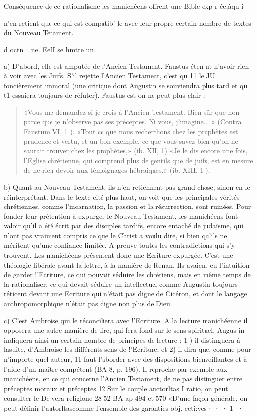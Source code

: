 Conséquence de ce rationalisme les manichéens offrent une Bible exp r ée,àqu i
 
n'en retient que ce qui est compatib' le avec leur propre certain nombre de textes du Nouveau Tetament.
 
d octn· ne. EeII se hmtte	un
 

a)	D'abord, elle est amputée de l'Ancien Testament. Faustus éten nt n'avoir rien à voir avec les Juifs. S'il rejette l'Ancien Testament, c'est qu 11 le JU foncièrement immoral (une critique dont Augustin se souviendra plus tard et qu t1
essaiera toujours de réfuter). Faustus est on ne peut plus clair  :
\begin{quote}
    «Vous me demandez si je crois à l'Ancien Testament. Bien sûr que non parce que je n'observe pas ses préceptes. Ni vous, j'imagine... » (Contra Faustum VI, 1 ). «Tout ce que nous recherchons chez les prophètes est prudence et vertu, et un bon exemple, ce que vous savez bien qu'on ne saurait trouver chez les prophètes,» (ib. XII, 1) «Je le dis encore une fois, l'Eglise chrétienne, qui comprend plus de gentils que de juifs, est en mesure de ne rien devoir aux témoignages hébraiques.» (ib. XIII, 1 ).

\end{quote}

b)	Quant au Nouveau Testament, ils n'en retiennent pas grand chose, sinon en le réinterprétant. Dans le texte cité plus haut, on voit que les principales vérités chrétiennes, comme l'incarnation, la passion et la résurrection, sont ruinées.	Pour fonder leur prétention à expurger le Nouveau Testament, les manichéens font valoir qu'il a été écrit par des disciples tardifs, encore entaché de judaïsme, qui n'ont pas vraiment compris ce que le Christ a voulu dire, si bien qu'ils ne méritent qu'une confiance limitée. A preuve toutes les contradictions qui s'y trouvent. Les manichéens présentent donc une Ecriture expurgée. C'est une théologie libérale avant la lettre, à la manière de Renan. Ils avaient eu l'intuition de garder !'Ecriture, ce qui pouvait séduire les chrétiens, mais en même temps de la rationaliser, ce qui devait séduire un intellectuel comme Augustin toujours réticent devant une Ecriture qui n'était pas digne de Cicéron, et dont le langage anthropomorphique n'était pas digne non plus de Dieu.

c)	C'est Ambroise qui le réconciliera avec !'Ecriture. A la lecture manichéenne il opposera une autre manière de lire, qui fera fond sur le	sens	spirituel. Augus in indiquera ainsi un certain nombre de principes de lecture : 1 ) il distinguera à lasuite, d'Ambroise les différents sens de !'Ecriture; et 2) il dira que, comme pour n'importe quel auteur,	11 faut l'aborder avec des dispositions bienveillantes et à l'aide d'un maître compétent (BA 8, p. 196). Il reproche par exemple aux manichéens, en ce qui concerne l'Ancien Testament, de ne pas distinguer entre préceptes moraux et préceptes
12 Sur le couple auctorltas I ratio, on peut consulter le De vera religlone 28 52 BA ap	494 et 570
«D'une façon générale, on peut définir l'autorltascomme l'ensemble des garanties obj.	ecti:ves·	· · 1- ·
 
